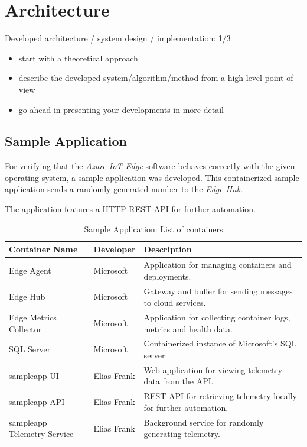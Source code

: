 \chapter{Architecture}

Developed architecture / system design / implementation: 1/3

\begin{itemize}
\item start with a theoretical approach
\item describe the developed system/algorithm/method from a high-level point of view
\item go ahead in presenting your developments in more detail
\end{itemize}

\section{Sample Application}
For verifying that the \textit{Azure IoT Edge} software behaves correctly
with the given operating system, a sample application was developed. This
containerized sample application sends a randomly generated number to the
\textit{Edge Hub}.

The application features a \ac{HTTP} \ac{REST} \ac{API} for further automation.

\begin{table}[H]
    \centering
    \begin{tabular}{ p{} p{} p{}}
        \toprule
        \textbf{Container Name} & \textbf{Developer} & \textbf{Description} \\
        \midrule
        Edge Agent & Microsoft & Application for managing containers and deployments. \\
        Edge Hub & Microsoft & Gateway and buffer for sending messages to cloud services. \\
        Edge Metrics Collector & Microsoft & Application for collecting container logs, metrics and health data. \\
        SQL Server & Microsoft & Containerized instance of Microsoft's SQL server. \\
        sampleapp UI & Elias Frank & Web application for viewing telemetry data from the \ac{API}. \\
        sampleapp API & Elias Frank & \ac{REST} \ac{API} for retrieving telemetry locally for further automation. \\
        sampleapp Telemetry Service & Elias Frank & Background service for randomly generating telemetry. \\
        \bottomrule
    \end{tabular}
    \caption{Sample Application: List of containers}
\end{table}

